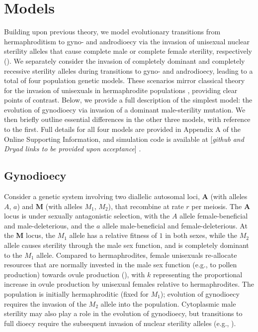 \documentclass{article}
\newcommand\hl[1]{%
  \bgroup
  \hskip0pt\color{blue!80!black}%
  #1%
  \egroup
}
\begin{document}
\section*{Models} \label{sec:Models}

Building upon previous theory, we model evolutionary transitions from hermaphroditism to gyno- and androdioecy via the invasion of unisexual nuclear sterility alleles that cause complete male or complete female sterility, respectively (\citealt{Charlesworth1978a}). We separately consider the invasion of completely dominant and completely recessive sterility alleles during transitions to gyno- and androdioecy, leading to a total of four population genetic models. These scenarios mirror classical theory for the invasion of unisexuals in hermaphrodite populations \citep{Charlesworth1978a}, providing clear points of contrast. Below, we provide a full description of the simplest model: the evolution of gynodioecy via invasion of a dominant male-sterility mutation. We then briefly outline essential differences in the other three models, with reference to the first. Full details for all four models are provided in Appendix A of the Online Supporting Information, \hl{and simulation code is available at [\textit{github and Dryad links to be provided upon acceptance}]}.%

\subsection*{Gynodioecy}

Consider a genetic system involving two diallelic autosomal loci, $\mathbf{A}$ (with alleles $A$, $a$) and $\mathbf{M}$ (with alleles $M_1$, $M_2$), that recombine at rate $r$ per meiosis. The $\mathbf{A}$ locus is under sexually antagonistic selection, with the $A$ allele female-beneficial and male-deleterious, and the $a$ allele male-beneficial and female-deleterious. At the $\mathbf{M}$ locus, the $M_1$ allele has a relative fitness of $1$ in both sexes, while the $M_2$ allele causes sterility through the male sex function, and is completely dominant to the $M_1$ allele. Compared to hermaphrodites, female unisexuals re-allocate resources that are normally invested in the male sex function (e.g., to pollen production) towards ovule production (\citealt{Lloyd1975,Lloyd1976,Charlesworth1978a}), with $k$ representing the proportional increase in ovule production by unisexual females relative to hermaphrodites. The population is initially hermaphroditic (fixed for $M_1$); evolution of gynodioecy requires the invasion of the $M_2$ allele into the population. \hl{Cytoplasmic male sterility may also play a role in the evolution of gynodioecy, but transitions to full dioecy require the subsequent invasion of nuclear sterility alleles (e.g., \citealt{Lewis1941,Frank1989,Charlesworth2006,Charlesworth2002}).}
\end{document}
